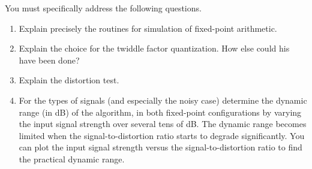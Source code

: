 \documentclass[11pt]{article}
\begin{document}
You must specifically address the following questions.

\begin{enumerate}
\item Explain precisely the routines for simulation of fixed-point arithmetic.
\item Explain the choice for the twiddle factor quantization.  How else could his have been done?
\item Explain the distortion test.
\item For the types of signals (and especially the noisy case) determine the dynamic range (in dB) of the algorithm, in both fixed-point configurations
by varying the input signal strength over several tens of dB.  The dynamic range becomes limited when the signal-to-distortion ratio starts to 
degrade significantly.  You can plot the input signal strength versus the signal-to-distortion ratio to find the practical dynamic range.
\end{enumerate}

\makeatother 
\end{document}
